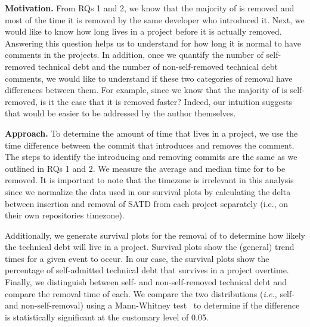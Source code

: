 \noindent\textbf{Motivation.} From RQs 1 and 2, we know that the majority of \SATD is removed and most of the time it is removed by the same developer who introduced it. Next, we would like to know how long \SATD lives in a project before it is actually removed. Answering this question helps us to understand for how long it is normal to have \SATD comments in the projects. In addition, once we quantify the number of self-removed technical debt and the number of non-self-removed technical debt comments, we would like to understand if these two categories of removal have differences between them. For example, since we know that the majority of \SATD is self-removed, is it the case that it is removed faster? Indeed, our intuition suggests that \SATD would be easier to be addressed by the author themselves. 

\noindent\textbf{Approach.} To determine the amount of time that \SATD lives in a project, we use the time difference between the commit that introduces and removes the \SATD comment. The steps to identify the \SATD introducing and removing commits are the same as we outlined in RQs 1 and 2. We measure the average and median time for \SATD to be removed. It is important to note that the timezone is irrelevant in this analysis since we normalize the data used in our survival plots by calculating the delta between insertion and removal of SATD from each project separately (i.e., on their own repositories timezone).

Additionally, we generate survival plots for the removal of \SATD to determine how likely the technical debt will live in a project. Survival plots show the (general) trend times for a given event to occur. In our case, the survival plots show the  percentage of self-admitted technical debt that survives in a project overtime. Finally, we distinguish between self- and non-self-removed technical debt and compare the removal time of each. We compare the two distributions (\emph{i.e.}, self- and non-self-removal) using a Mann-Whitney test~\cite{mann1947test} to determine if the difference is statistically significant at the customary level of 0.05.




